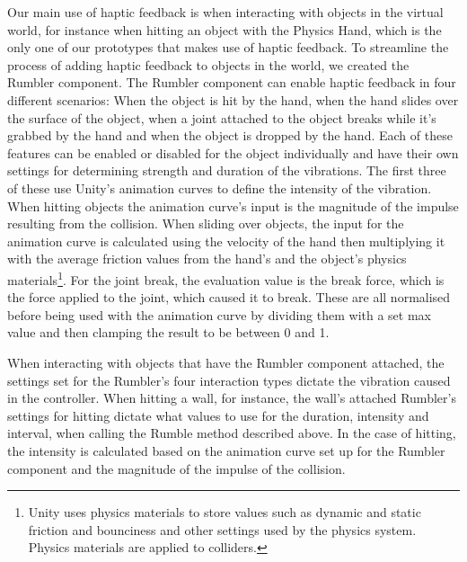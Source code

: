 Our main use of haptic feedback is when interacting with objects in the virtual world, for instance when hitting an object with the Physics Hand, which is the only one of our prototypes that makes use of haptic feedback. To streamline the process of adding haptic feedback to objects in the world, we created the Rumbler component. The Rumbler component can enable haptic feedback in four different scenarios: When the object is hit by the hand, when the hand slides over the surface of the object, when a joint attached to the object breaks while it's grabbed by the hand and when the object is dropped by the hand. Each of these features can be enabled or disabled for the object individually and have their own settings for determining strength and duration of the vibrations. The first three of these use Unity's animation curves to define the intensity of the vibration. When hitting objects the animation curve's input is the magnitude of the impulse resulting from the collision. When sliding over objects, the input for the animation curve is calculated using the velocity of the hand then multiplying it with the average friction values from the hand's and the object's physics materials\footnote{Unity uses physics materials to store values such as dynamic and static friction and bounciness and other settings used by the physics system. Physics materials are applied to colliders.}. For the joint break, the evaluation value is the break force, which is the force applied to the joint, which caused it to break. These are all normalised before being used with the animation curve by dividing them with a set max value and then clamping the result to be between 0 and 1.

When interacting with objects that have the Rumbler component attached, the settings set for the Rumbler's four interaction types dictate the vibration caused in the controller. When hitting a wall, for instance, the wall's attached Rumbler's settings for hitting dictate what values to use for the duration, intensity and interval, when calling the Rumble method described above. In the case of hitting, the intensity is calculated based on the animation curve set up for the Rumbler component and the magnitude of the impulse of the collision.




